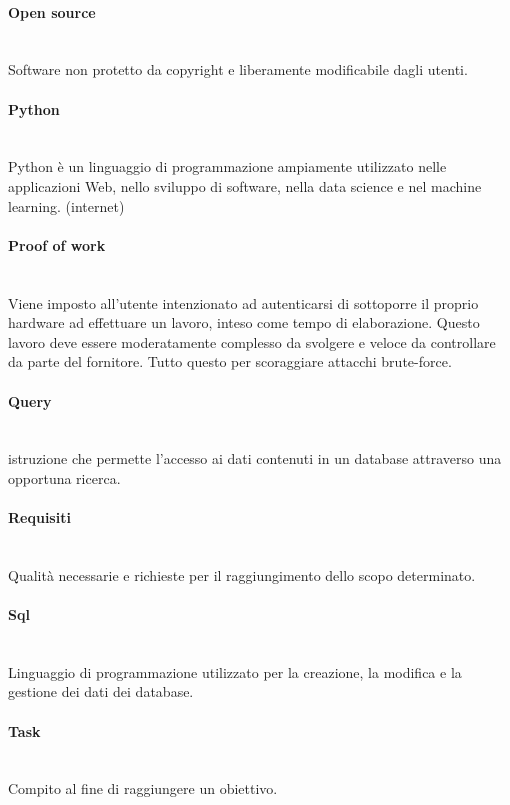 \paragraph{Open source}~\smallskip \\
Software non protetto da copyright e liberamente modificabile dagli utenti.

\paragraph{Python}~\smallskip \\
Python è un linguaggio di programmazione ampiamente utilizzato nelle applicazioni Web, nello sviluppo di software, nella data science e nel machine learning. (internet)

\paragraph{Proof of work}~\smallskip \\
Viene imposto all'utente intenzionato ad autenticarsi di sottoporre il proprio hardware ad effettuare un lavoro, inteso come tempo di elaborazione. Questo lavoro deve essere moderatamente complesso da svolgere e veloce da controllare da parte del fornitore. Tutto questo per scoraggiare attacchi brute-force.

\paragraph{Query}~\smallskip \\
istruzione che permette l'accesso ai dati contenuti in un database attraverso una opportuna ricerca.

\paragraph{Requisiti}~\smallskip \\
Qualità necessarie e richieste per il raggiungimento dello scopo determinato.

\paragraph{Sql}~\smallskip \\
Linguaggio di programmazione utilizzato per la creazione, la modifica e la gestione dei dati dei database.

\paragraph{Task}~\smallskip \\
Compito al fine di raggiungere un obiettivo.

